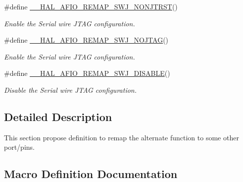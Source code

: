 \begin{DoxyCompactItemize}
\#define \hyperlink{group___g_p_i_o_ex___a_f_i_o___a_f___r_e_m_a_p_p_i_n_g_ga1febef38fae374565df1b5dfdfd8c906}{\+\_\+\+\_\+\+H\+A\+L\+\_\+\+A\+F\+I\+O\+\_\+\+R\+E\+M\+A\+P\+\_\+\+S\+W\+J\+\_\+\+N\+O\+N\+J\+T\+R\+ST}()
\begin{DoxyCompactList}\small\item\em Enable the Serial wire J\+T\+AG configuration. \end{DoxyCompactList}\item 
\#define \hyperlink{group___g_p_i_o_ex___a_f_i_o___a_f___r_e_m_a_p_p_i_n_g_ga31fc766920d61e6bb176500c0a4077e5}{\+\_\+\+\_\+\+H\+A\+L\+\_\+\+A\+F\+I\+O\+\_\+\+R\+E\+M\+A\+P\+\_\+\+S\+W\+J\+\_\+\+N\+O\+J\+T\+AG}()
\begin{DoxyCompactList}\small\item\em Enable the Serial wire J\+T\+AG configuration. \end{DoxyCompactList}\item 
\#define \hyperlink{group___g_p_i_o_ex___a_f_i_o___a_f___r_e_m_a_p_p_i_n_g_ga3225ff38abac044926aac7d6f1c84168}{\+\_\+\+\_\+\+H\+A\+L\+\_\+\+A\+F\+I\+O\+\_\+\+R\+E\+M\+A\+P\+\_\+\+S\+W\+J\+\_\+\+D\+I\+S\+A\+B\+LE}()
\begin{DoxyCompactList}\small\item\em Disable the Serial wire J\+T\+AG configuration. \end{DoxyCompactList}\end{DoxyCompactItemize}


\subsection{Detailed Description}
This section propose definition to remap the alternate function to some other port/pins. 



\subsection{Macro Definition Documentation}
\mbox{\label{group___g_p_i_o_ex___a_f_i_o___a_f___r_e_m_a_p_p_i_n_g_gabfe11a5ef987530e111e8e20a11e5be2}} 
